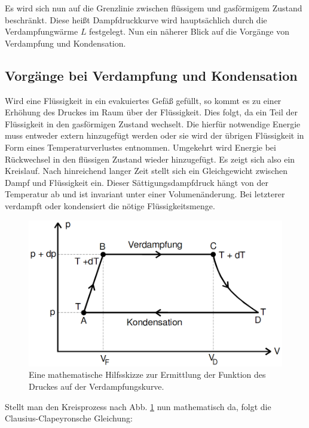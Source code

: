      Es wird sich nun auf die Grenzlinie zwischen flüssigem und gasförmigem Zustand
      beschränkt. Diese heißt Dampfdruckkurve wird hauptsächlich durch die
      Verdampfungwärme $L$ festgelegt. Nun ein näherer Blick auf die Vorgänge von
      Verdampfung und Kondensation.
\subsection{Vorgänge bei Verdampfung und Kondensation}
Wird eine Flüssigkeit in ein evakuiertes Gefäß gefüllt, so kommt es zu einer
 Erhöhung des Druckes im Raum über der Flüssigkeit. Dies folgt, da ein Teil der
  Flüssigkeit in den gasförmigen Zustand wechselt. Die hierfür notwendige
   Energie muss entweder extern hinzugefügt werden oder sie wird der übrigen
    Flüssigkeit in Form eines Temperaturverlustes entnommen. Umgekehrt wird
     Energie bei Rückwechsel in den flüssigen Zustand wieder hinzugefügt. Es
      zeigt sich also ein Kreislauf. Nach hinreichend langer Zeit stellt sich
       ein Gleichgewicht zwischen Dampf und Flüssigkeit ein. Dieser
        Sättigungsdampfdruck hängt von der Temperatur ab und ist invariant unter einer Volumenänderung. Bei letzterer
         verdampft oder kondensiert die nötige Flüssigkeitsmenge.
         \begin{figure}
         	\centering
         	\includegraphics[width=\linewidth-150pt,height=\textheight-150pt,keepaspectratio]{content/Bilder/Kreislauf.png}
         	\caption{Eine mathematische Hilfsskizze zur Ermittlung der Funktion des Druckes auf der Verdampfungskurve\cite{V203}.}
         	\label{fig:Kreislauf}
         \end{figure}
         Stellt man den Kreisprozess nach Abb. \ref{fig:Kreislauf} nun mathematisch da, folgt die Clausius-Clapeyronsche Gleichung:
